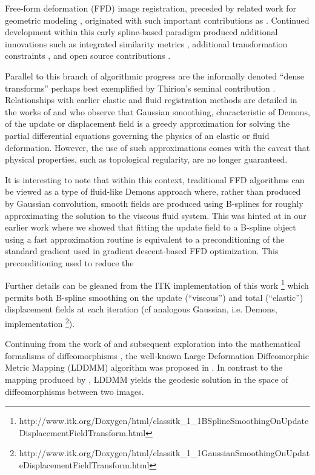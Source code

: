 \documentclass{frontiersSCNS}
\begin{document}
Free-form deformation (FFD) image registration, preceded by related work for
geometric modeling \citep{sederberg1986}, originated with such important
contributions as \cite{szeliski1997,thevenaz1998,rueckert1999}.  Continued 
development within this early spline-based paradigm produced additional innovations
such as integrated similarity metrics \citep[e.g.][]{mattes2003}, additional transformation
constraints \citep[e.g.][]{rohlfing2003}, and open source contributions \citep[e.g.][]{ibanez2005,klein2010,shackleford2010}.

Parallel to this branch of algorithmic progress are the informally 
denoted ``dense transforms''
perhaps best exemplified by Thirion's seminal contribution \citep{thirion1998}.
Relationships with earlier elastic \citep{bajcsy1989,gee1993} and fluid \citep{christensen1996} registration methods are detailed in 
the works of \cite{bro-nielsen1996} and \cite{pennec1999} who observe that
Gaussian smoothing, characteristic of Demons, of the update or displacement
field is a greedy approximation for solving the partial differential equations governing
the physics of an elastic or fluid deformation.  However, the use of such 
approximations comes with the caveat that physical properties, such as topological
regularity, are no longer guaranteed.
 
It is interesting to note that within this context, traditional FFD algorithms
can be viewed as a type of fluid-like Demons approach 
where, rather than produced by Gaussian convolution, smooth fields are produced using B-splines for roughly approximating the solution to the viscous fluid system.  This was hinted at in our earlier work \citep{tustison2009} where we showed that fitting the update field to a B-spline object using a fast approximation routine \citep{tustison2006} is equivalent to a preconditioning of the standard gradient used in gradient descent-based FFD optimization.  This preconditioning used to reduce the 

Further details can be gleaned from the ITK implementation of this work%
\footnote{
http://www.itk.org/Doxygen/html/classitk\_1\_1BSplineSmoothingOnUpdateDisplacementFieldTransform.html
}
which permits both B-spline smoothing on the update (``viscous'') and total (``elastic'') 
displacement fields at each iteration (cf
analogous Gaussian, i.e. Demons, implementation%
\footnote{
http://www.itk.org/Doxygen/html/classitk\_1\_1GaussianSmoothingOnUpdateDisplacementFieldTransform.html
}).

Continuing from the work of \cite{christensen1996} and subsequent exploration into the mathematical formalisms of diffeomorphisms \citep[e.g.][]{dupuis1998}, 
the well-known Large Deformation Diffeomorphic Metric Mapping (LDDMM) algorithm  
was proposed in \cite{Beg2005}.  In contrast to the mapping produced
by \cite{christensen1996}, LDDMM yields the geodesic solution in the space of diffeomorphisms between two images.  
\end{document}

